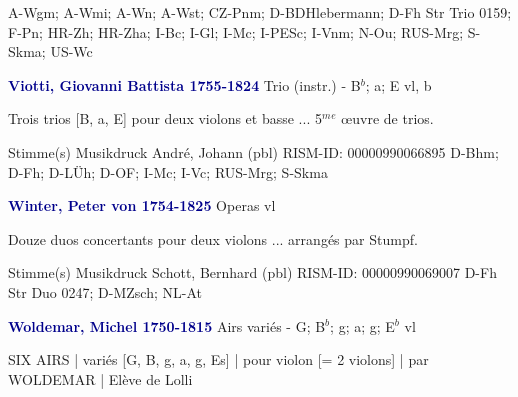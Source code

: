 \documentclass[twocolumn]{book}
\begin{document}
\newline A-Wgm; A-Wmi; A-Wn; A-Wst; CZ-Pnm; D-BDHlebermann; D-Fh  Str Trio 0159; F-Pn; HR-Zh; HR-Zha; I-Bc; I-Gl; I-Mc; I-PESc; I-Vnm; N-Ou; RUS-Mrg; S-Skma; US-Wc
\newline \par \vspace{7pt} \textcolor{darkblue}{\textbf{Viotti, Giovanni Battista  1755-1824}}
\newline Trio (instr.) - B$^b$; a; E
 vl, b
\newline \begin{itshape}Trois trios [B, a, E] pour deux violons et basse ... 5$^m$$^e$ œuvre de trios.\end{itshape} 
\newline \textcolor{darkblue}{}  Stimme(s)
\newline Musikdruck
\newline André, Johann  (pbl)
\newline RISM-ID: 00000990066895
\newline D-Bhm; D-Fh; D-LÜh; D-OF; I-Mc; I-Vc; RUS-Mrg; S-Skma
\newline \par \vspace{7pt} \textcolor{darkblue}{\textbf{Winter, Peter von  1754-1825}}
\newline Operas
 vl
\newline \begin{itshape}Douze duos concertants pour deux violons ... arrangés par Stumpf.\end{itshape} 
\newline \textcolor{darkblue}{}  Stimme(s)
\newline Musikdruck
\newline Schott, Bernhard  (pbl)
\newline RISM-ID: 00000990069007
\newline D-Fh  Str Duo 0247; D-MZsch; NL-At
\newline \par \vspace{7pt} \textcolor{darkblue}{\textbf{Woldemar, Michel  1750-1815}}
\newline Airs variés - G; B$^b$; g; a; g; E$^b$
 vl
\newline \begin{itshape}SIX AIRS | variés [G, B, g, a, g, Es] | pour violon [= 2 violons] | par WOLDEMAR | Elève de Lolli\end{itshape} 
\end{document}

